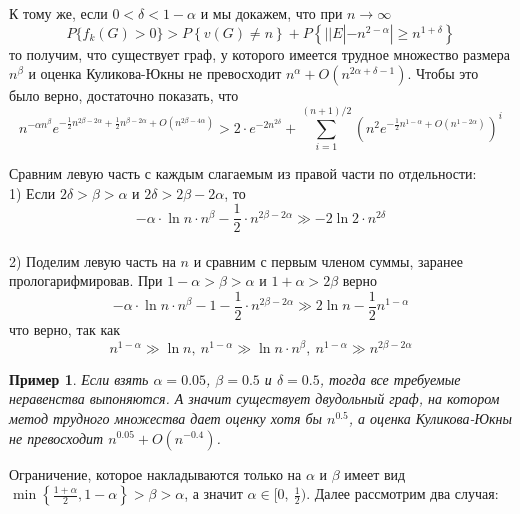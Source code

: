 \documentclass[a4paper]{article}
\newtheorem*{mexample}{Пример}
\begin{document}
К тому же, если $0 < \delta < 1 - \alpha$ и мы докажем, что при $n \rightarrow \infty$ $$P\{f_k(G) > 0\} > P\left\{v(G) \neq n\right\} + P\left\{||E| - n^{2-\alpha}| \geq
n^{1+\delta}\right\}$$ то получим, что существует граф, у которого имеется трудное множество 
размера $n^\beta$ и оценка Куликова-Юкны не превосходит $n^{\alpha} + O(n^{2\alpha + \delta-1})$. Чтобы это было верно, достаточно показать, что 
$$n^{-\alpha n^{\beta}} e^{-\frac{1}{2}n^{2\beta-2\alpha} + \frac{1}{2}n^{\beta - 2\alpha} + O(n^{2\beta - 4\alpha})} > 
2\cdot e^{-2n^{2\delta}} + \sum\limits_{i=1}^{(n+1)/2}\left(n^2e^{-\frac{1}{2}n^{1-\alpha} + O(n^{1-2\alpha})}\right)^i$$

Сравним левую часть с каждым слагаемым из правой части по отдельности:\ \\
1) Если $2\delta > \beta > \alpha$ и $2\delta > 2\beta - 2\alpha$, то $$-\alpha\cdot \ln{n}\cdot n^{\beta} - 
\frac{1}{2}\cdot n^{2\beta - 2\alpha} \gg -2\ln{2}\cdot n^{2\delta}$$\ \\
2) Поделим левую часть на $n$ и сравним с первым членом суммы, заранее прологарифмировав. При 
$1-\alpha > \beta > \alpha$ и $1+\alpha > 2\beta$ верно $$-\alpha\cdot \ln{n}\cdot n^{\beta} - 1 -
\frac{1}{2}\cdot n^{2\beta - 2\alpha} \gg 2\ln{n} - \frac{1}{2}n^{1-\alpha}$$ что верно, так как 
$$n^{1-\alpha} \gg \ln{n},\ n^{1-\alpha} \gg \ln{n}\cdot n^{\beta},\ n^{1-\alpha} \gg n^{2\beta - 2\alpha}$$

\begin{mexample}
    Если взять $\alpha = 0.05$, $\beta = 0.5$ и $\delta = 0.5$, тогда все требуемые неравенства выпоняются.
    А значит существует двудольный граф, на котором метод трудного множества дает оценку хотя бы $n^{0.5}$, а  
    оценка Куликова-Юкны не превосходит $n^{0.05} + O(n^{-0.4})$.
\end{mexample}


Ограничение, которое накладываются только на $\alpha$ и $\beta$ имеет вид $\min\left\{\frac{1+\alpha}{2},
1-\alpha\right\} > \beta > \alpha$, а значит $\alpha \in [0,\ \frac{1}{2})$. Далее рассмотрим два случая:
\end{document}
